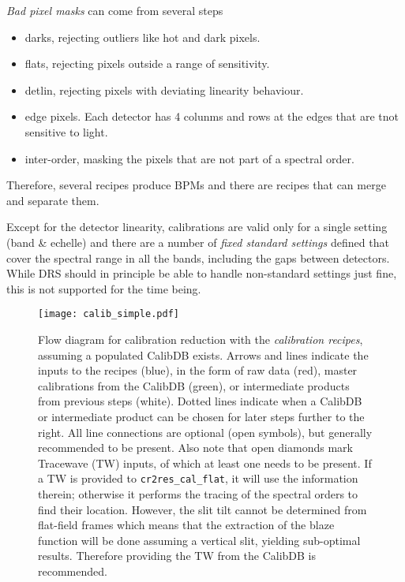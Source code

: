 \emph{Bad pixel masks} can come from several steps
\begin{itemize}
    \item darks, rejecting outliers like hot and dark pixels.
    \item flats, rejecting pixels outside a range of sensitivity.
    \item detlin, rejecting pixels with deviating linearity behaviour.
    \item edge pixels. Each detector has 4 colunms and rows at the edges that
        are tnot sensitive to light.
    \item inter-order, masking the pixels that are not part of a spectral order.
\end{itemize}

Therefore, several recipes produce BPMs and there are recipes that can merge
and separate them.

Except for the detector linearity, calibrations are valid only for a
single setting (band \& echelle) and there are a number of \textit{fixed
standard settings} defined that cover the spectral range in all the bands,
including the gaps between detectors. While DRS should in principle be able to
handle non-standard settings just fine, this is not supported for the time
being.


\begin{figure}[!tb]
    \begin{center}
        \texttt{[image: calib\_simple.pdf]}
    \end{center}
    \caption{
        \label{fig:calibflow_simple}
        Flow diagram for calibration reduction with the \textit{calibration
        recipes}, assuming a populated CalibDB exists. Arrows and lines
        indicate the inputs to the recipes (blue), in the form of raw data
        (red), master calibrations from the CalibDB (green), or intermediate
        products from previous steps (white). Dotted lines indicate when a
        CalibDB or intermediate product can be chosen for later steps
        further to the right. All line connections are optional (open
        symbols), but generally recommended to be present. Also note that
        open diamonds mark Tracewave (TW) inputs, of which at least one
        needs to be present.
        \newline
        If a TW is provided to \texttt{cr2res\_cal\_flat}, it will use the
        information therein; otherwise it performs the tracing of the spectral
        orders to find their location. However, the slit tilt cannot be
        determined from flat-field frames which means that the extraction of the
        blaze function will be done assuming a vertical slit, yielding
        sub-optimal results. Therefore providing the TW from the CalibDB is
        recommended.
    }
\end{figure}


